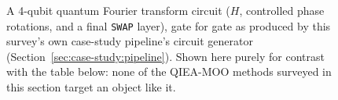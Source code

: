 \begin{figure}[H]
  \centering
  
  \caption{A 4-qubit quantum Fourier transform circuit ($H$, controlled
    phase rotations, and a final \texttt{SWAP} layer), gate for gate as
    produced by this survey's own case-study pipeline's circuit generator
    (Section~\ref{sec:case-study:pipeline}). Shown here purely for
    contrast with the table below: none of the QIEA-MOO methods
    surveyed in this section target an object like it.}
  \label{fig:qft-example}
\end{figure}

\begingroup
\footnotesize
\setlength{\LTleft}{-\extralength}
\setlength{\LTright}{0cm}
\setlength{\LTcapwidth}{\textwidth}
